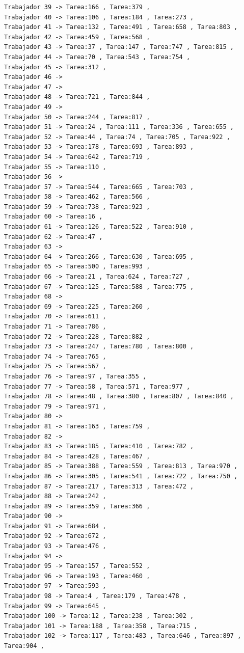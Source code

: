 \documentclass{article}
\begin{document}
\begin{lstlisting}
Trabajador 39 -> Tarea:166 , Tarea:379 , 
Trabajador 40 -> Tarea:106 , Tarea:184 , Tarea:273 , 
Trabajador 41 -> Tarea:132 , Tarea:491 , Tarea:658 , Tarea:803 , 
Trabajador 42 -> Tarea:459 , Tarea:568 , 
Trabajador 43 -> Tarea:37 , Tarea:147 , Tarea:747 , Tarea:815 , 
Trabajador 44 -> Tarea:70 , Tarea:543 , Tarea:754 , 
Trabajador 45 -> Tarea:312 , 
Trabajador 46 -> 
Trabajador 47 -> 
Trabajador 48 -> Tarea:721 , Tarea:844 , 
Trabajador 49 -> 
Trabajador 50 -> Tarea:244 , Tarea:817 , 
Trabajador 51 -> Tarea:24 , Tarea:111 , Tarea:336 , Tarea:655 , 
Trabajador 52 -> Tarea:44 , Tarea:74 , Tarea:705 , Tarea:922 , 
Trabajador 53 -> Tarea:178 , Tarea:693 , Tarea:893 , 
Trabajador 54 -> Tarea:642 , Tarea:719 , 
Trabajador 55 -> Tarea:110 , 
Trabajador 56 -> 
Trabajador 57 -> Tarea:544 , Tarea:665 , Tarea:703 , 
Trabajador 58 -> Tarea:462 , Tarea:566 , 
Trabajador 59 -> Tarea:738 , Tarea:923 , 
Trabajador 60 -> Tarea:16 , 
Trabajador 61 -> Tarea:126 , Tarea:522 , Tarea:910 , 
Trabajador 62 -> Tarea:47 , 
Trabajador 63 -> 
Trabajador 64 -> Tarea:266 , Tarea:630 , Tarea:695 , 
Trabajador 65 -> Tarea:500 , Tarea:993 , 
Trabajador 66 -> Tarea:21 , Tarea:624 , Tarea:727 , 
Trabajador 67 -> Tarea:125 , Tarea:588 , Tarea:775 , 
Trabajador 68 -> 
Trabajador 69 -> Tarea:225 , Tarea:260 , 
Trabajador 70 -> Tarea:611 , 
Trabajador 71 -> Tarea:786 , 
Trabajador 72 -> Tarea:228 , Tarea:882 , 
Trabajador 73 -> Tarea:247 , Tarea:780 , Tarea:800 , 
Trabajador 74 -> Tarea:765 , 
Trabajador 75 -> Tarea:567 , 
Trabajador 76 -> Tarea:97 , Tarea:355 , 
Trabajador 77 -> Tarea:58 , Tarea:571 , Tarea:977 , 
Trabajador 78 -> Tarea:48 , Tarea:380 , Tarea:807 , Tarea:840 , 
Trabajador 79 -> Tarea:971 , 
Trabajador 80 -> 
Trabajador 81 -> Tarea:163 , Tarea:759 , 
Trabajador 82 -> 
Trabajador 83 -> Tarea:185 , Tarea:410 , Tarea:782 , 
Trabajador 84 -> Tarea:428 , Tarea:467 , 
Trabajador 85 -> Tarea:388 , Tarea:559 , Tarea:813 , Tarea:970 , 
Trabajador 86 -> Tarea:305 , Tarea:541 , Tarea:722 , Tarea:750 , 
Trabajador 87 -> Tarea:217 , Tarea:313 , Tarea:472 , 
Trabajador 88 -> Tarea:242 , 
Trabajador 89 -> Tarea:359 , Tarea:366 , 
Trabajador 90 -> 
Trabajador 91 -> Tarea:684 , 
Trabajador 92 -> Tarea:672 , 
Trabajador 93 -> Tarea:476 , 
Trabajador 94 -> 
Trabajador 95 -> Tarea:157 , Tarea:552 , 
Trabajador 96 -> Tarea:193 , Tarea:460 , 
Trabajador 97 -> Tarea:593 , 
Trabajador 98 -> Tarea:4 , Tarea:179 , Tarea:478 , 
Trabajador 99 -> Tarea:645 , 
Trabajador 100 -> Tarea:12 , Tarea:238 , Tarea:302 , 
Trabajador 101 -> Tarea:188 , Tarea:358 , Tarea:715 , 
Trabajador 102 -> Tarea:117 , Tarea:483 , Tarea:646 , Tarea:897 , Tarea:904 , 

\end{lstlisting}
\end{document}
